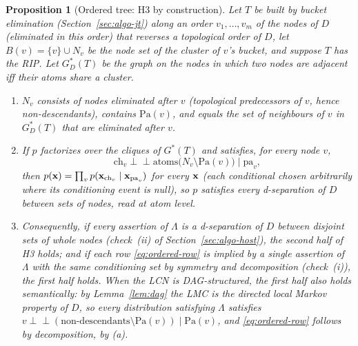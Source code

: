 \documentclass{article} %
\newtheorem{proposition}{Proposition}
\newcommand{\indep}{\perp\!\!\!\perp}
\newcommand{\ch}{\mathrm{ch}}
\newcommand{\pa}{\mathrm{pa}}
\newcommand{\atoms}{\mathrm{atoms}}
\providecommand{\Pa}{\mathrm{Pa}}
\begin{document}
\begin{proposition}[Ordered tree: H3 by construction]\label{prop:ordered}
Let $T$ be built by bucket elimination (Section~\ref{sec:algo-jt}) along an order
$v_1,\dots,v_m$ of the nodes of $D$ (eliminated in this order) that reverses a
topological order of $D$, let $B(v)=\{v\}\cup N_v$ be the node set of the
cluster of $v$'s bucket, and suppose $T$ has the RIP. Let $G^\ast_D(T)$ be the
graph on the nodes in which two nodes are adjacent iff their atoms share a cluster.
\begin{enumerate}
\item[(a)] $N_v$ consists of nodes eliminated after $v$ (topological predecessors
  of $v$, hence non-descendants), contains $\Pa(v)$, and equals the set of
  neighbours of $v$ in $G^\ast_D(T)$ that are eliminated after $v$.
\item[(b)] If $p$ factorizes over the cliques of $G^\ast(T)$ and satisfies, for
  every node $v$,
  \begin{equation}\label{eq:ordered-row}
    \ch_v\indep \atoms\bigl(N_v\setminus\Pa(v)\bigr)\mid\pa_v,
  \end{equation}
  then $p(\bx)=\prod_v p(\bx_{\ch_v}\mid\bx_{\pa_v})$ for every $\mathbf{x}$ (each
  conditional chosen arbitrarily where its conditioning event is null), so $p$
  satisfies every d-separation of $D$ between sets of nodes, read at atom level.
\item[(c)] Consequently, if every assertion of $\Lambda$ is a d-separation of $D$
  between disjoint sets of whole nodes (check~(ii) of Section~\ref{sec:algo-host}),
  the second half of H3 holds; and if each row \eqref{eq:ordered-row} is implied by
  a single assertion of $\Lambda$ with the same conditioning set by symmetry and
  decomposition (check~(i)), the first half holds. When the LCN is DAG-structured,
  the first half also holds semantically: by Lemma~\ref{lem:dag} the LMC is the
  directed local Markov property of $D$, so every distribution satisfying
  $\Lambda$ satisfies $v\indep(\text{non-descendants}\setminus\Pa(v))\mid\Pa(v)$, and
  \eqref{eq:ordered-row} follows by decomposition, by (a).
\end{enumerate}
\end{proposition}
\end{document}
